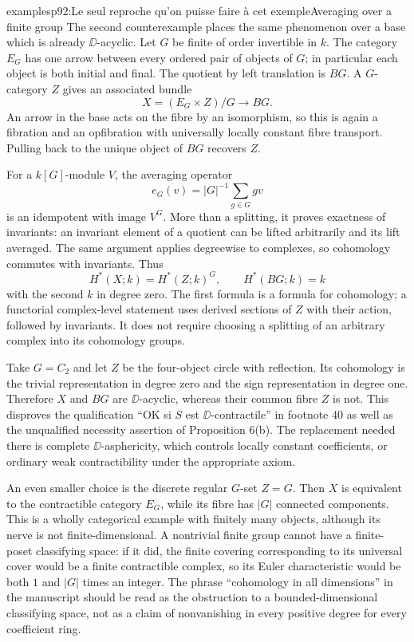 \begin{dcomment}{examples}{p92:Le seul reproche qu'on puisse faire à cet exemple}{Averaging over a finite group}
The second counterexample places the same phenomenon over a base which is already $\DD$-acyclic. Let $G$ be finite of order invertible in $k$. The category $E_G$ has one arrow between every ordered pair of objects of $G$; in particular each object is both initial and final. The quotient by left translation is $BG$. A $G$-category $Z$ gives an associated bundle
\[
 X=(E_G\times Z)/G\longrightarrow BG.
\]
An arrow in the base acts on the fibre by an isomorphism, so this is again a fibration and an opfibration with universally locally constant fibre transport. Pulling back to the unique object of $BG$ recovers $Z$.

For a $k[G]$-module $V$, the averaging operator
\[
 e_G(v)=|G|^{-1}\sum_{g\in G}gv
\]
is an idempotent with image $V^G$. More than a splitting, it proves exactness of invariants: an invariant element of a quotient can be lifted arbitrarily and its lift averaged. The same argument applies degreewise to complexes, so cohomology commutes with invariants. Thus
\[
 H^*(X;k)=H^*(Z;k)^G,\qquad H^*(BG;k)=k
\]
with the second $k$ in degree zero. The first formula is a formula for cohomology; a functorial complex-level statement uses derived sections of $Z$ with their action, followed by invariants. It does not require choosing a splitting of an arbitrary complex into its cohomology groups.

Take $G=C_2$ and let $Z$ be the four-object circle with reflection. Its cohomology is the trivial representation in degree zero and the sign representation in degree one. Therefore $X$ and $BG$ are $\DD$-acyclic, whereas their common fibre $Z$ is not. This disproves the qualification ``OK si $S$ est $\DD$-contractile'' in footnote 40 as well as the unqualified necessity assertion of Proposition 6(b). The replacement needed there is complete $\DD$-asphericity, which controls locally constant coefficients, or ordinary weak contractibility under the appropriate axiom.

An even smaller choice is the discrete regular $G$-set $Z=G$. Then $X$ is equivalent to the contractible category $E_G$, while its fibre has $|G|$ connected components. This is a wholly categorical example with finitely many objects, although its nerve is not finite-dimensional. A nontrivial finite group cannot have a finite-poset classifying space: if it did, the finite covering corresponding to its universal cover would be a finite contractible complex, so its Euler characteristic would be both $1$ and $|G|$ times an integer. The phrase ``cohomology in all dimensions'' in the manuscript should be read as the obstruction to a bounded-dimensional classifying space, not as a claim of nonvanishing in every positive degree for every coefficient ring.
\end{dcomment}


